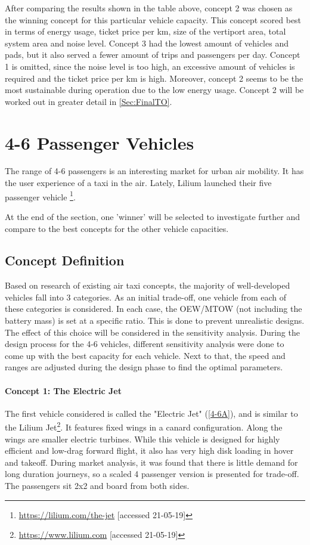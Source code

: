 After comparing the results shown in the table above, concept 2 was chosen as the winning concept for this particular vehicle capacity. This concept scored best in terms of energy usage, ticket price per km, size of the vertiport area, total system area and noise level. Concept 3 had the lowest amount of vehicles and pads, but it also served a fewer amount of trips and passengers per day. Concept 1 is omitted, since the noise level is too high, an excessive amount of vehicles is required and the ticket price per km is high. Moreover, concept 2 seems to be the most sustainable during operation due to the low energy usage. Concept 2 will be worked out in greater detail in \autoref{Sec:FinalTO}. 



\section{4-6 Passenger Vehicles}
The range of 4-6 passengers is an interesting market for urban air mobility. It has the user experience of a taxi in the air. Lately, Lilium launched their five passenger vehicle \footnote{\url{https://lilium.com/the-jet} [accessed 21-05-19]}. 


At the end of the section, one 'winner' will be selected to investigate further and compare to the best concepts for the other vehicle capacities. 

\subsection{Concept Definition}
Based on research of existing air taxi concepts, the majority of well-developed vehicles fall into 3 categories. As an initial trade-off, one vehicle from each of these categories is considered. In each case, the OEW/MTOW (not including the battery mass) is set at a specific ratio. This is done to prevent unrealistic designs. The effect of this choice will be considered in the sensitivity analysis. During the design process for the 4-6 vehicles, different sensitivity analysis were done to come up with the best capacity for each vehicle. Next to that, the speed and ranges are adjusted during the design phase to find the optimal parameters. 

\paragraph{Concept 1: The Electric Jet}
The first vehicle considered is called the "Electric Jet" (\autoref{4-6A}), and is similar to the Lilium Jet\footnote{\url{https://www.lilium.com} [accessed 21-05-19]}. It features fixed wings in a canard configuration. Along the wings are smaller electric turbines. While this vehicle is designed for highly efficient and low-drag forward flight, it also has very high disk loading in hover and takeoff. During market analysis, it was found that there is little demand for long duration journeys, so a scaled 4 passenger version is presented for trade-off. The passengers sit 2x2 and board from both sides.

